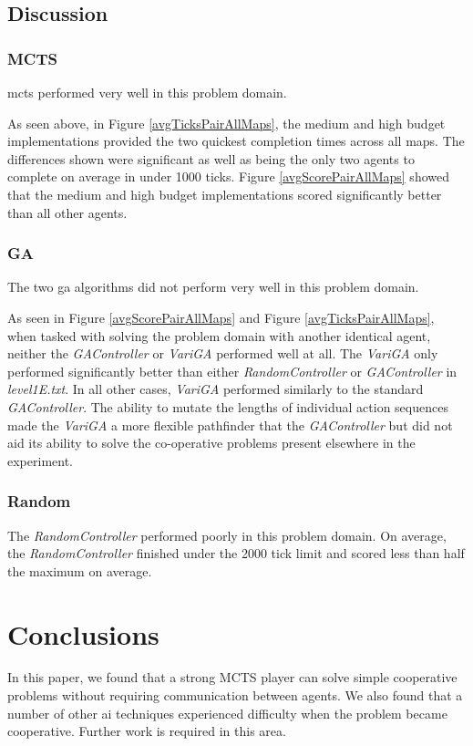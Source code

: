 \documentclass{IEEEtran}
\begin{document}
\subsection{Discussion}
\subsubsection{MCTS}
\gls{mcts} performed very well in this problem domain. 

As seen above, in Figure \ref{avgTicksPairAllMaps}, the medium and high budget implementations provided the two quickest completion times across all maps. The differences shown were significant as well as being the only two agents to complete on average in under 1000 ticks.  Figure \ref{avgScorePairAllMaps} showed that the medium and high budget implementations scored significantly better than all other agents.
\subsubsection{GA}
The two \gls{ga} algorithms did not perform very well in this problem domain. 

As seen in Figure \ref{avgScorePairAllMaps} and Figure \ref{avgTicksPairAllMaps}, when tasked with solving the problem domain with another identical agent, neither the \emph{GAController} or \emph{VariGA} performed well at all. The \emph{VariGA} only performed significantly better than either \emph{RandomController} or \emph{GAController} in \emph{level1E.txt}. In all other cases, \emph{VariGA} performed similarly to the standard \emph{GAController}. The ability to mutate the lengths of individual action sequences made the \emph{VariGA} a more flexible pathfinder that the \emph{GAController} but did not aid its ability to solve the co-operative problems present elsewhere in the experiment.
\subsubsection{Random}
The \emph{RandomController} performed poorly in this problem domain. On average, the \emph{RandomController} finished under the 2000 tick limit and scored less than half the maximum on average.
\section{Conclusions}
In this paper, we found that a strong MCTS player can solve simple cooperative problems without requiring communication between agents. We also found that a number of other \gls{ai} techniques experienced difficulty when the problem became cooperative. Further work is required in this area.
\end{document}
